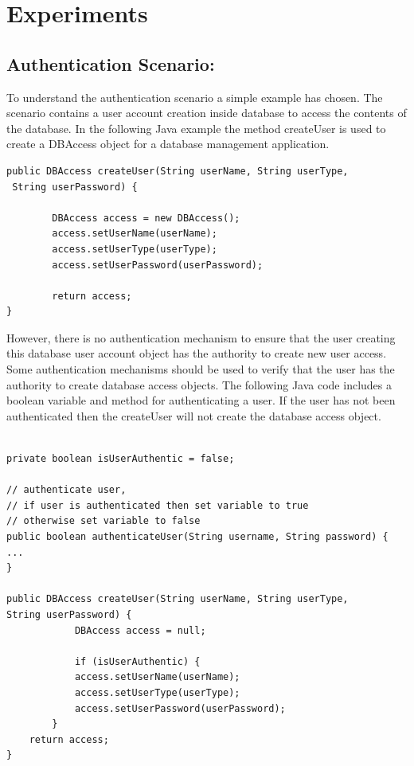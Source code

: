 \chapter{Experiments}
\section{Authentication Scenario:}

To understand the authentication scenario a simple example has chosen. The scenario contains a user account creation inside database to access the contents of the database. In the following Java example the method createUser is used to create a DBAccess object for a database management application.

\begin{lstlisting}
public DBAccess createUser(String userName, String userType,
 String userPassword) {

		DBAccess access = new DBAccess();
		access.setUserName(userName);
		access.setUserType(userType);
		access.setUserPassword(userPassword);	
				
		return access;
}

\end{lstlisting}

However, there is no authentication mechanism to ensure that the user creating this database user account object has the authority to create new user access. Some authentication mechanisms should be used to verify that the user has the authority to create database access objects.
The following Java code includes a boolean variable and method for authenticating a user. If the user has not been authenticated then the createUser will not create the database access object.

\begin{lstlisting}

private boolean isUserAuthentic = false;

// authenticate user,
// if user is authenticated then set variable to true
// otherwise set variable to false
public boolean authenticateUser(String username, String password) {
...
}

public DBAccess createUser(String userName, String userType,
String userPassword) {
			DBAccess access = null;
			
			if (isUserAuthentic) {
			access.setUserName(userName);
			access.setUserType(userType);
			access.setUserPassword(userPassword);
		}
	return access;
}
\end{lstlisting}

